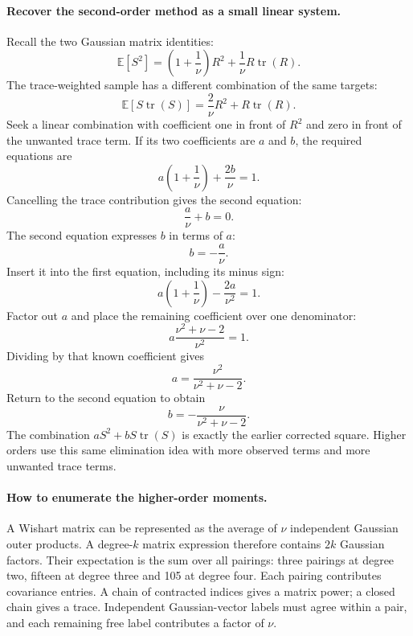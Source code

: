 \documentclass[11pt]{article}
\newcommand{\E}{\mathbb{E}}
\begin{document}
\paragraph{Recover the second-order method as a small linear system.}
Recall the two Gaussian matrix identities:
\begin{equation}
 \E[S^2]=\left(1+\frac1\nu\right)R^2
           +\frac1\nu R\operatorname{tr}(R).
\end{equation}
The trace-weighted sample has a different combination of the same targets:
\begin{equation}
 \E[S\operatorname{tr}(S)]
 =\frac2\nu R^2+R\operatorname{tr}(R).
\end{equation}
Seek a linear combination with coefficient one in front of $R^2$ and zero
in front of the unwanted trace term. If its two coefficients are $a$ and
$b$, the required equations are
\begin{equation}
 a\left(1+\frac1\nu\right)+\frac{2b}{\nu}=1.
\end{equation}
Cancelling the trace contribution gives the second equation:
\begin{equation}
 \frac a\nu+b=0.
\end{equation}
The second equation expresses $b$ in terms of $a$:
\begin{equation}
 b=-\frac a\nu.
\end{equation}
Insert it into the first equation, including its minus sign:
\begin{equation}
 a\left(1+\frac1\nu\right)-\frac{2a}{\nu^2}=1.
\end{equation}
Factor out $a$ and place the remaining coefficient over one denominator:
\begin{equation}
 a\frac{\nu^2+\nu-2}{\nu^2}=1.
\end{equation}
Dividing by that known coefficient gives
\begin{equation}
 a=\frac{\nu^2}{\nu^2+\nu-2}.
\end{equation}
Return to the second equation to obtain
\begin{equation}
 b=-\frac{\nu}{\nu^2+\nu-2}.
\end{equation}
The combination $aS^2+bS\operatorname{tr}(S)$ is exactly the earlier
corrected square. Higher orders use this same elimination idea with more
observed terms and more unwanted trace terms.

\paragraph{How to enumerate the higher-order moments.}
A Wishart matrix can be represented as the average of $\nu$ independent
Gaussian outer products. A degree-$k$ matrix expression therefore contains
$2k$ Gaussian factors. Their expectation is the sum over all pairings:
three pairings at degree two, fifteen at degree three and 105 at degree
four. Each pairing contributes covariance entries. A chain of contracted
indices gives a matrix power; a closed chain gives a trace. Independent
Gaussian-vector labels must agree within a pair, and each remaining free
label contributes a factor of $\nu$.
\end{document}
